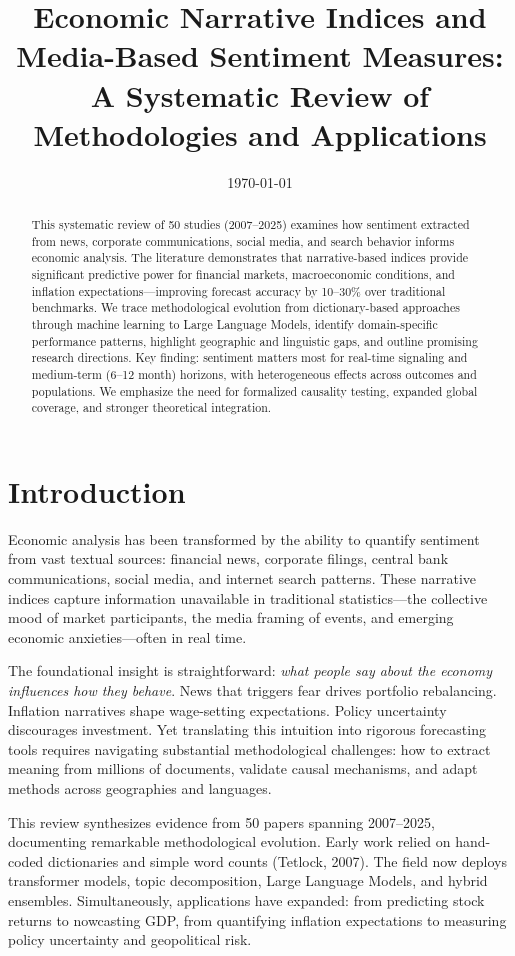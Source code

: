 \documentclass[12pt,a4paper]{article}
\title{Economic Narrative Indices and Media-Based Sentiment Measures: \\
A Systematic Review of Methodologies and Applications}
\author{}
\date{\today}
\begin{document}
\maketitle

\begin{abstract}
This systematic review of 50 studies (2007--2025) examines how sentiment extracted from news, corporate communications, social media, and search behavior informs economic analysis. The literature demonstrates that narrative-based indices provide significant predictive power for financial markets, macroeconomic conditions, and inflation expectations—improving forecast accuracy by 10--30\% over traditional benchmarks. We trace methodological evolution from dictionary-based approaches through machine learning to Large Language Models, identify domain-specific performance patterns, highlight geographic and linguistic gaps, and outline promising research directions. Key finding: sentiment matters most for real-time signaling and medium-term (6--12 month) horizons, with heterogeneous effects across outcomes and populations. We emphasize the need for formalized causality testing, expanded global coverage, and stronger theoretical integration.
\end{abstract}

\section{Introduction}
\label{sec:intro}

Economic analysis has been transformed by the ability to quantify sentiment from vast textual sources: financial news, corporate filings, central bank communications, social media, and internet search patterns. These narrative indices capture information unavailable in traditional statistics—the collective mood of market participants, the media framing of events, and emerging economic anxieties—often in real time.

The foundational insight is straightforward: \textit{what people say about the economy influences how they behave}. News that triggers fear drives portfolio rebalancing. Inflation narratives shape wage-setting expectations. Policy uncertainty discourages investment. Yet translating this intuition into rigorous forecasting tools requires navigating substantial methodological challenges: how to extract meaning from millions of documents, validate causal mechanisms, and adapt methods across geographies and languages.

This review synthesizes evidence from 50 papers spanning 2007--2025, documenting remarkable methodological evolution. Early work relied on hand-coded dictionaries and simple word counts (Tetlock, 2007). The field now deploys transformer models, topic decomposition, Large Language Models, and hybrid ensembles. Simultaneously, applications have expanded: from predicting stock returns to nowcasting GDP, from quantifying inflation expectations to measuring policy uncertainty and geopolitical risk.
\end{document}

